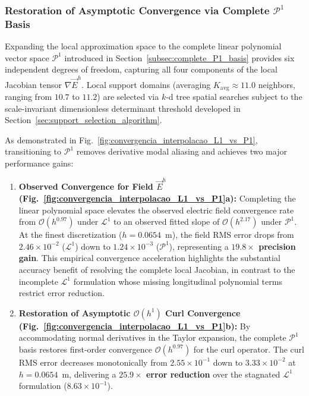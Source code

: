 \documentclass[preprint,12pt]{elsarticle}
\begin{document}
\subsubsection{Restoration of Asymptotic Convergence via Complete \texorpdfstring{$\mathcal{P}^1$}{P1} Basis}
Expanding the local approximation space to the complete linear polynomial vector space $\mathcal{P}^1$ introduced in Section~\ref{subsec:complete_P1_basis} provides six independent degrees of freedom, capturing all four components of the local Jacobian tensor $\nabla\vec{E}^h$. Local support domains (averaging $K_{\mathrm{avg}} \approx 11.0$ neighbors, ranging from $10.7$ to $11.2$) are selected via $k$-d tree spatial searches subject to the scale-invariant dimensionless determinant threshold developed in Section~\ref{sec:support_selection_algorithm}.

As demonstrated in Fig.~\ref{fig:convergencia_interpolacao_L1_vs_P1}, transitioning to $\mathcal{P}^1$ removes derivative modal aliasing and achieves two major performance gains:
\begin{enumerate}
    \item \textbf{Observed Convergence for Field $\vec{E}^h$ (Fig.~\ref{fig:convergencia_interpolacao_L1_vs_P1}a):} Completing the linear polynomial space elevates the observed electric field convergence rate from $\mathcal{O}(h^{0.97})$ under $\mathcal{L}^1$ to an observed fitted slope of $\mathcal{O}(h^{2.17})$ under $\mathcal{P}^1$. At the finest discretization ($h = 0.0654$~m), the field RMS error drops from $2.46 \times 10^{-2}$ ($\mathcal{L}^1$) down to $1.24 \times 10^{-3}$ ($\mathcal{P}^1$), representing a \textbf{$19.8\times$ precision gain}. This empirical convergence acceleration highlights the substantial accuracy benefit of resolving the complete local Jacobian, in contrast to the incomplete $\mathcal{L}^1$ formulation whose missing longitudinal polynomial terms restrict error reduction.
    \item \textbf{Restoration of Asymptotic $\mathcal{O}(h^1)$ Curl Convergence (Fig.~\ref{fig:convergencia_interpolacao_L1_vs_P1}b):} By accommodating normal derivatives in the Taylor expansion, the complete $\mathcal{P}^1$ basis restores first-order convergence $\mathcal{O}(h^{0.97})$ for the curl operator. The curl RMS error decreases monotonically from $2.55 \times 10^{-1}$ down to $3.33 \times 10^{-2}$ at $h = 0.0654$~m, delivering a \textbf{$25.9\times$ error reduction} over the stagnated $\mathcal{L}^1$ formulation ($8.63 \times 10^{-1}$).
\end{enumerate}
\end{document}
